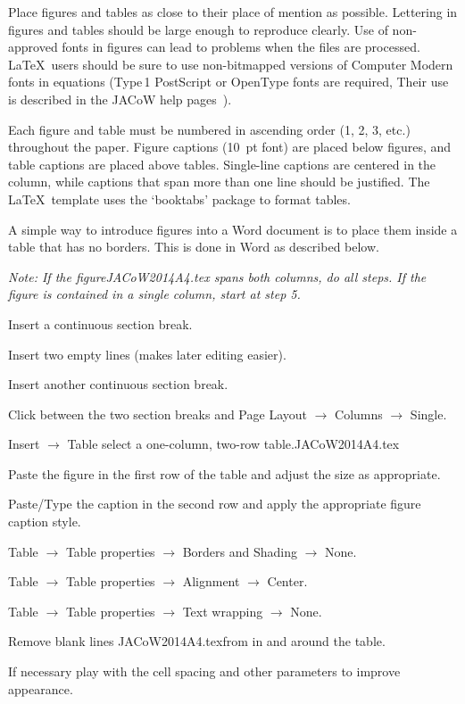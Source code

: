 \documentclass[a4paper,
              ]{jacow}
\begin{document}
Place figures and tables as close to their place of mention as
possible. Lettering in figures and tables should be large enough to
reproduce clearly. Use of non-approved fonts in figures can lead to
problems when the files are processed. \LaTeX\ users should be sure to use
non-bitmapped versions of Computer Modern fonts in equations (Type\,1 PostScript
or OpenType fonts are required, Their use is described in the JACoW help
pages~\cite{jacow-help}).

Each figure and table must be numbered in ascending order (1, 2, 3, etc.) throughout
the paper. Figure captions (\SI{10}{pt} font) are placed below figures, and table captions are placed above tables. Single-line captions are centered in the column, while captions that span more than one line should be justified. The \LaTeX\ template uses the ‘booktabs’ package to
format tables.

A simple way to introduce figures into a Word document is to place them inside a table that has no borders. This is done in Word as described below.

\textit{Note: If the figureJACoW2014A4.tex spans both columns, do all steps. If
the figure is contained in a single column, start at step 5.}

\begin{Enumerate}
\item	Insert a continuous section break.
\item	Insert two empty lines (makes later editing easier).
\item	Insert another continuous section break.
\item	Click between the two section breaks and Page Layout $\rightarrow$
        Columns $\rightarrow$ Single.
\item	Insert $\rightarrow$ Table select a one-column, two-row table.JACoW2014A4.tex
\item	Paste the figure in the first row of the table and adjust the size as appropriate.
\item	Paste/Type the caption in the second row and apply the appropriate figure caption style.
\item	Table $\rightarrow$ Table properties $\rightarrow$ Borders and
        Shading $\rightarrow$ None.
\item	Table $\rightarrow$ Table properties $\rightarrow$ Alignment $\rightarrow$ Center.
\item	Table $\rightarrow$ Table properties $\rightarrow$ Text wrapping $\rightarrow$ None.
\item	Remove blank lines JACoW2014A4.texfrom in and around the table.
\item	If necessary play with the cell spacing and other parameters to improve appearance.
\end{Enumerate}
\end{document}

